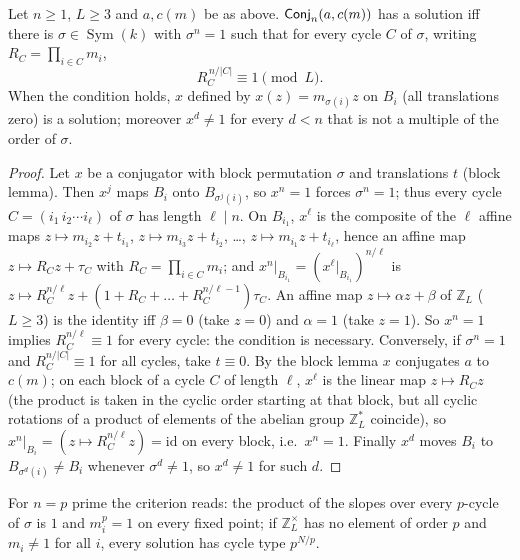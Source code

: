 \documentclass[preprint,12pt]{elsarticle}
\theoremstyle{definition}\newtheorem{defi}[thm]{Definition}\newtheorem{prob}[thm]{Problem}\newtheorem{obs}[thm]{Observation}
\theoremstyle{remark}\newtheorem{rem}[thm]{Remark}
\newcommand{\ZZ}{\mathbb Z}\newcommand{\Sym}{\operatorname{Sym}}\newcommand{\Alt}{\operatorname{Alt}}
\begin{document}
\begin{lem}[affine criterion for $x^{n}=1$]\label{lem:affinen}\label{lem:affinep}
Let $n\ge1$, $L\ge3$ and $a,c(m)$ be as above. $\mathsf{Conj}_{n}(a,c(m))$ has a solution iff there is $\sigma\in\Sym(k)$ with
$\sigma^{n}=1$ such that for every cycle $C$ of $\sigma$, writing $R_C=\prod_{i\in C}m_i$,
\[ R_C^{\,n/|C|}\equiv1\pmod L. \]
When the condition holds, $x$ defined by $x(z)=m_{\sigma(i)}z$ on $B_i$ (all translations zero) is a solution; moreover
$x^{d}\neq1$ for every $d<n$ that is not a multiple of the order of $\sigma$.
\end{lem}
\begin{proof}
Let $x$ be a conjugator with block permutation $\sigma$ and translations $t$ (block lemma). Then $x^{j}$ maps $B_i$ onto
$B_{\sigma^{j}(i)}$, so $x^{n}=1$ forces $\sigma^{n}=1$; thus every cycle $C=(i_1\,i_2\cdots i_\ell)$ of $\sigma$ has length
$\ell\mid n$. On $B_{i_1}$, $x^{\ell}$ is the composite of the $\ell$ affine maps $z\mapsto m_{i_2}z+t_{i_1}$,
$z\mapsto m_{i_3}z+t_{i_2}$, \dots, $z\mapsto m_{i_1}z+t_{i_\ell}$, hence an affine map $z\mapsto R_Cz+\tau_C$ with
$R_C=\prod_{i\in C}m_i$; and $x^{n}|_{B_{i_1}}=(x^{\ell}|_{B_{i_1}})^{n/\ell}$ is $z\mapsto R_C^{n/\ell}z+(1+R_C+\dots+R_C^{n/\ell-1})\tau_C$.
An affine map $z\mapsto\alpha z+\beta$ of $\ZZ_L$ ($L\ge3$) is the identity iff $\beta=0$ (take $z=0$) and $\alpha=1$ (take $z=1$).
So $x^{n}=1$ implies $R_C^{n/\ell}\equiv1$ for every cycle: the condition is necessary.
Conversely, if $\sigma^{n}=1$ and $R_C^{n/|C|}\equiv1$ for all cycles, take $t\equiv0$. By the block lemma $x$ conjugates $a$ to $c(m)$;
on each block of a cycle $C$ of length $\ell$, $x^{\ell}$ is the linear map $z\mapsto R_Cz$ (the product is taken in the cyclic order
starting at that block, but all cyclic rotations of a product of elements of the abelian group $\ZZ_L^{*}$ coincide), so
$x^{n}|_{B_i}=(z\mapsto R_C^{n/\ell}z)=\mathrm{id}$ on every block, i.e.\ $x^{n}=1$. Finally $x^{d}$ moves $B_i$ to
$B_{\sigma^{d}(i)}\ne B_i$ whenever $\sigma^{d}\ne1$, so $x^{d}\ne1$ for such $d$.
\end{proof}

For $n=p$ prime the criterion reads: the product of the slopes over every $p$-cycle of $\sigma$ is $1$ and $m_i^{p}=1$ on every fixed
point; if $\ZZ_L^{\times}$ has no element of order $p$ and $m_i\neq1$ for all $i$, every solution has cycle type $p^{N/p}$.
\end{document}
